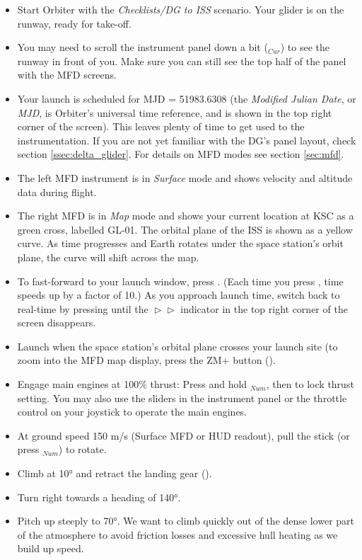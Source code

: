\documentclass[Orbiter User Manual.tex]{subfiles}
\begin{document}
\begin{itemize}
\item Start Orbiter with the \textit{Checklists/DG to ISS} scenario. Your glider is on the runway, ready for take-off.
\item You may need to scroll the instrument panel down a bit (\UArrow$_{Cur}$) to see the runway in front of you. Make sure you can still see the top half of the panel with the MFD screens.
\item Your launch is scheduled for MJD = 51983.6308 (the \textit{Modified Julian Date}, or \textit{MJD}, is Orbiter's universal time reference, and is shown in the top right corner of the screen). This leaves plenty of time to get used to the instrumentation. If you are not yet familiar with the DG's panel layout, check section \ref{ssec:delta_glider}. For details on MFD modes see section \ref{sec:mfd}.
\item The left MFD instrument is in \textit{Surface} mode and shows velocity and altitude data during flight.
\item The right MFD is in \textit{Map} mode and shows your current location at KSC as a green cross, labelled GL-01. The orbital plane of the ISS is shown as a yellow curve. As time progresses and Earth rotates under the space station's orbit plane, the curve will shift across the map.
\item To fast-forward to your launch window, press . (Each time you press , time speeds up by a factor of 10.) As you approach launch time, switch back to real-time by pressing  until the $\vartriangleright\vartriangleright$ indicator in the top right corner of the screen disappears.
\item Launch when the space station's orbital plane crosses your launch site (to zoom into the MFD map display, press the ZM+ button (\Shift{}).
\item Engage main engines at 100\% thrust: Press and hold \keystroke{+}$_{Num}$, then \Ctrl to lock thrust setting. You may also use the sliders in the instrument panel or the throttle control on your joystick to operate the main engines.
\item At ground speed 150 m/s (Surface MFD or HUD readout), pull the stick (or press $_{Num}$) to rotate.
\item Climb at 10° and retract the landing gear ().
\item Turn right towards a heading of 140°.
\item Pitch up steeply to 70°. We want to climb quickly out of the dense lower part of the atmosphere to avoid friction losses and excessive hull heating as we build up speed.

\end{itemize}
\end{document}
